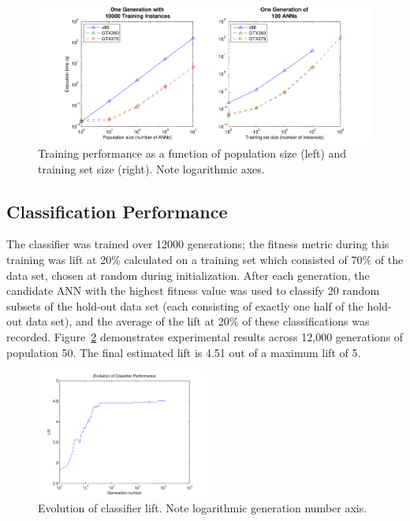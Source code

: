 \documentclass[11pt]{article}       %
\begin{document}
\begin{figure}[h]
	\centering
	\includegraphics[width=\textwidth]{fig-performance-genericx86}
	\caption{Training performance as a function of population size (left) and training set size (right). Note logarithmic axes.}
	\label{fig:training-performance}
\end{figure}

\subsection{Classification Performance} \label{results}
The classifier was trained over 12000 generations; the fitness metric during this training was lift at 20\% calculated on a training set which consisted of 70\% of the data set, chosen at random during initialization.  After each generation, the candidate ANN with the highest fitness value was used to classify 20 random subsets of the hold-out data set (each consisting of exactly one half of the hold-out data set), and the average of the lift at 20\% of these classifications was recorded.  Figure~\ref{fig:evolution-lift} demonstrates experimental results across 12,000 generations of population 50. The final estimated lift is 4.51 out of a maximum lift of 5.

\begin{figure}[h]
	\centering
	\includegraphics[width=0.5\textwidth]{fig-evolution-lift}
	\caption{Evolution of classifier lift. Note logarithmic generation number axis.}
	\label{fig:evolution-lift}
\end{figure}
\end{document}
